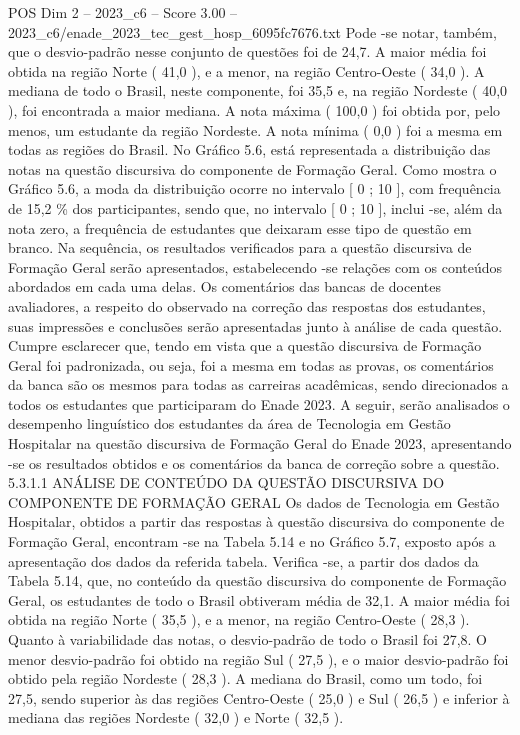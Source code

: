 \begin{textsample}{POS Dim 2 – 2023\_c6 – Score 3.00 – 2023\_c6/enade\_2023\_tec\_gest\_hosp\_6095fc7676.txt}
Pode -se notar, também, que o desvio-padrão nesse conjunto de questões foi de 24,7.
A maior média foi obtida na região Norte ( 41,0 ), e a menor, na região Centro-Oeste ( 34,0 ).
A mediana de todo o Brasil, neste componente, foi 35,5 e, na região Nordeste ( 40,0 ), foi encontrada a maior mediana.
A nota máxima ( 100,0 ) foi obtida por, pelo menos, um estudante da região Nordeste.
A nota mínima ( 0,0 ) foi a mesma em todas as regiões do Brasil.
No Gráfico 5.6, está representada a distribuição das notas na questão discursiva do componente de Formação Geral.
Como mostra o Gráfico 5.6, a moda da distribuição ocorre no intervalo [ 0 ; 10 ], com frequência de 15,2 \% dos participantes, sendo que, no intervalo [ 0 ; 10 ], inclui -se, além da nota zero, a frequência de estudantes que deixaram esse tipo de questão em branco.
Na sequência, os resultados verificados para a questão discursiva de Formação Geral serão apresentados, estabelecendo -se relações com os conteúdos abordados em cada uma delas.
Os comentários das bancas de docentes avaliadores, a respeito do observado na correção das respostas dos estudantes, suas impressões e conclusões serão apresentadas junto à análise de cada questão.
Cumpre esclarecer que, tendo em vista que a questão discursiva de Formação Geral foi padronizada, ou seja, foi a mesma em todas as provas, os comentários da banca são os mesmos para todas as carreiras acadêmicas, sendo direcionados a todos os estudantes que participaram do Enade 2023.
A seguir, serão analisados o desempenho linguístico dos estudantes da área de Tecnologia em Gestão Hospitalar na questão discursiva de Formação Geral do Enade 2023, apresentando -se os resultados obtidos e os comentários da banca de correção sobre a questão. 5.3.1.1 ANÁLISE DE CONTEÚDO DA QUESTÃO DISCURSIVA DO COMPONENTE DE FORMAÇÃO GERAL Os dados de Tecnologia em Gestão Hospitalar, obtidos a partir das respostas à questão discursiva do componente de Formação Geral, encontram -se na Tabela 5.14 e no Gráfico 5.7, exposto após a apresentação dos dados da referida tabela.
Verifica -se, a partir dos dados da Tabela 5.14, que, no conteúdo da questão discursiva do componente de Formação Geral, os estudantes de todo o Brasil obtiveram média de 32,1.
A maior média foi obtida na região Norte ( 35,5 ), e a menor, na região Centro-Oeste ( 28,3 ).
Quanto à variabilidade das notas, o desvio-padrão de todo o Brasil foi 27,8.
O menor desvio-padrão foi obtido na região Sul ( 27,5 ), e o maior desvio-padrão foi obtido pela região Nordeste ( 28,3 ).
A mediana do Brasil, como um todo, foi 27,5, sendo superior às das regiões Centro-Oeste ( 25,0 ) e Sul ( 26,5 ) e inferior à mediana das regiões Nordeste ( 32,0 ) e Norte ( 32,5 ).

\end{textsample}
